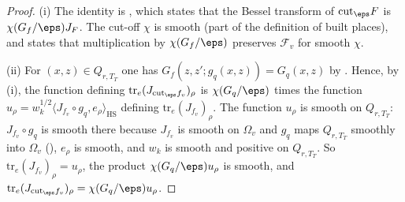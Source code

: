 \begin{proof}
(i) The identity is , which states that the Bessel transform of
$\mathrm{cut}_\eps F$ is $\chi(G_f/\eps)J_F$. The cut-off $\chi$ is smooth (part of the definition of built places), and
 states that multiplication by $\chi(G_f/\eps)$ preserves
$\mathcal F_v$ for smooth $\chi$.

(ii) For $(x,z)\in Q_{r,T_T}$ one has $G_f(z,z';g_q(x,z))=G_q(x,z)$ by
. Hence, by (i), the function defining
$\mathrm{tr}_e(J_{\mathrm{cut}_\eps f_v})_\rho$ is $\chi(G_q/\eps)$ times the function
$u_\rho=w_k^{1/2}\langle J_{f_v}\circ g_q,e_\rho\rangle_{\mathrm{HS}}$ defining $\mathrm{tr}_e(J_{f_v})_\rho$. The function
$u_\rho$ is smooth on $Q_{r,T_T}$: $J_{f_v}\circ g_q$ is smooth there because $J_{f_v}$ is smooth on $\Omega_v$ and $g_q$ maps
$Q_{r,T_T}$ smoothly into $\Omega_v$ (), $e_\rho$ is smooth, and
$w_k$ is smooth and positive on $Q_{r,T_T}$. So $\mathrm{tr}_e(J_{f_v})_\rho=u_\rho$, the product $\chi(G_q/\eps)u_\rho$ is
smooth, and $\mathrm{tr}_e(J_{\mathrm{cut}_\eps f_v})_\rho=\chi(G_q/\eps)u_\rho$.
\end{proof}

